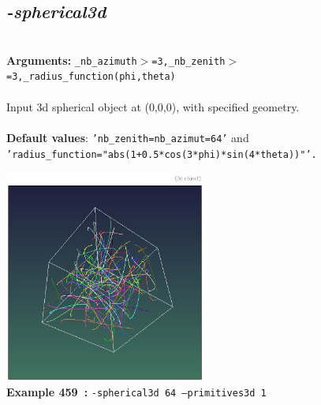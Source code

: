 \documentclass[a4paper,11pt,twoside]{book}
\begin{document}
\subsection{\emph{-spherical3d} }\vspace*{-0.5em}
~\\\textbf{Arguments: } 
{\small \texttt{\_nb\_azimuth$>$=3,\_nb\_zenith$>$=3,\_radius\_function(phi,theta)}}\\~\\
Input 3d spherical object at (0,0,0), with specified geometry.
~\\~\\\textbf{Default values}: {\small \texttt{'nb\_zenith=nb\_azimut=64'} and \texttt{'radius\_function="abs(1+0.5*cos(3*phi)*sin(4*theta))"'.}}
\begin{center}\includegraphics[keepaspectratio=true,height=7cm,width=\textwidth]{img/gmic_def459.jpg}\\
{\footnotesize \textbf{Example 459~:} \texttt{-spherical3d 64 --primitives3d 1}}
\end{center}
\end{document}
